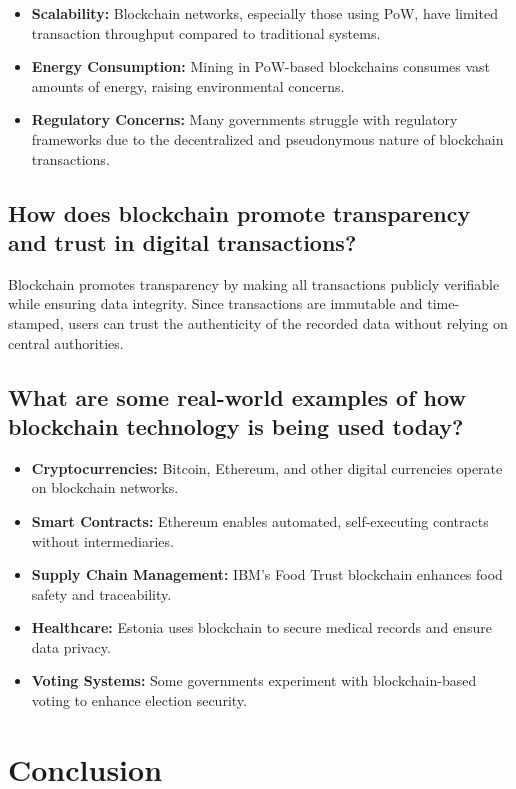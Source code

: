 \documentclass[11pt]{article}
\begin{document}
\begin{itemize}
    \item \textbf{Scalability:} Blockchain networks, especially those using PoW, have limited transaction throughput compared to traditional systems.
    \item \textbf{Energy Consumption:} Mining in PoW-based blockchains consumes vast amounts of energy, raising environmental concerns.
    \item \textbf{Regulatory Concerns:} Many governments struggle with regulatory frameworks due to the decentralized and pseudonymous nature of blockchain transactions.
\end{itemize}

\subsection{How does blockchain promote transparency and trust in digital transactions?}

Blockchain promotes transparency by making all transactions publicly verifiable while ensuring data integrity. Since transactions are immutable and time-stamped, users can trust the authenticity of the recorded data without relying on central authorities.

\subsection{What are some real-world examples of how blockchain technology is being used today?}

\begin{itemize}
    \item \textbf{Cryptocurrencies:} Bitcoin, Ethereum, and other digital currencies operate on blockchain networks.
    \item \textbf{Smart Contracts:} Ethereum enables automated, self-executing contracts without intermediaries.
    \item \textbf{Supply Chain Management:} IBM's Food Trust blockchain enhances food safety and traceability.
    \item \textbf{Healthcare:} Estonia uses blockchain to secure medical records and ensure data privacy.
    \item \textbf{Voting Systems:} Some governments experiment with blockchain-based voting to enhance election security.
\end{itemize}

\section{Conclusion}
\end{document}
